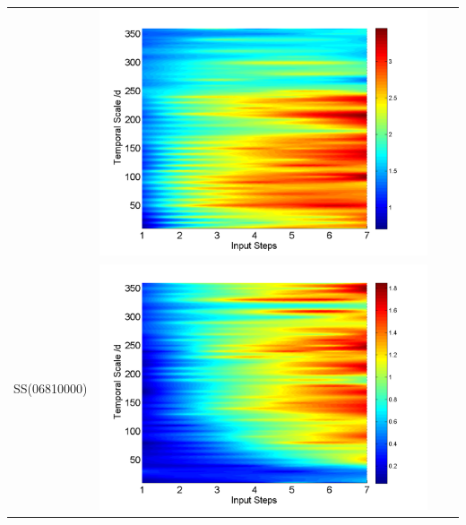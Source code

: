 \documentclass[review]{elsarticle}
\begin{document}
\begin{table}[H]
\begin{tabular}{cccc}
&\begin{minipage}{.3\textwidth}\includegraphics[width=\linewidth]{resultgraph/11532500pepq.png}\end{minipage}
\\
SS(06810000)
&\begin{minipage}{.3\textwidth}\includegraphics[width=\linewidth]{resultgraph/06810000p.png}\end{minipage}

\end{tabular}
\end{table}
\end{document}
